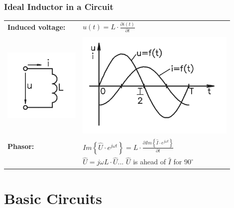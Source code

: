 \documentclass{beamer}
\begin{document}
	\begin{frame}
    \frametitle{Ideal Inductor in a Circuit}
		\begin{center}
		\begin{tabular}{m{0.3\linewidth} m{0.6\linewidth}}
			\textbf{Induced voltage:} 	& $u\left(t\right)= L\cdot \frac{\partial i\left(t\right)}{\partial t}$\\\\
			\includegraphics[scale=0.4]{obr09_obvodCiv.png}	& \includegraphics[scale=0.5]{obr10_obvodCivGraf.png}\\
			\textbf{Phasor:}						& $Im\left\{\hat{U}\cdot e^{j\omega t}\right\} = L\cdot \frac{\partial Im\left\{\hat{I}\cdot e^{j\omega t}\right\}}{\partial t}$\\
																	& $\hat{U} = j\omega L \cdot \hat{U}$... $\hat{U}$ is ahead of $\hat{I}$ for $90^\circ$
		\end{tabular}
		\end{center}
  \end{frame}
\section{\texorpdfstring{Basic Circuits}{Basic Circuits}}
\end{document}
